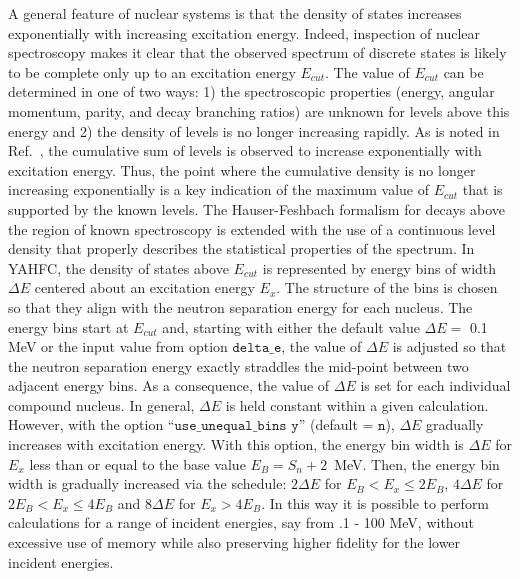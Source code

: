 \documentclass[
10pt,
showpacs,preprintnumbers,footinbib,
amsfonts,amsmath,amssymb,
aps,
prc,twocolumn,groupedaddress,superscriptaddress,
showkeys,
nofootinbib
]{revtex4-1}
\begin{document}
A general feature of nuclear systems is that the density of states increases exponentially with increasing excitation energy. Indeed, inspection of nuclear spectroscopy makes it clear that the observed spectrum of discrete states is likely to be complete only up to an excitation energy $E_{cut}$. The value of $E_{cut}$ can be determined in one of two ways: 1) the spectroscopic properties (energy, angular momentum, parity, and decay branching ratios) are unknown for levels above this energy and 2) the density of levels is no longer increasing rapidly. 
As is noted in Ref.~\cite{Gilbert:1965}, the cumulative sum of levels is observed to increase exponentially with excitation energy. Thus, the point where the cumulative density is no longer increasing exponentially is a key indication of the maximum value of $E_{cut}$ that is supported by the known levels.
The Hauser-Feshbach formalism for decays above the region of known spectroscopy is extended with the use of a continuous level density that properly describes the statistical properties of the spectrum. In YAHFC, the density of states above $E_{cut}$ is represented by energy bins of width 
$\Delta E$ centered about an excitation energy $E_x$. The structure of the bins is chosen so that they align with the neutron separation energy for each nucleus. The energy bins start at $E_{cut}$ and, starting with either the default value $\Delta E = $ 0.1 MeV or the input value from option 
${\texttt{delta\_e}}$, the value of $\Delta E$ is adjusted so that the neutron separation energy exactly straddles the mid-point between two adjacent energy bins. As a consequence, the value of $\Delta E$ is set for each individual compound nucleus. In general, $\Delta E$ is held constant within a given calculation. However, with the option 
``${\texttt{use\_unequal\_bins y}}$'' (default = ${\texttt{n}}$), $\Delta E$ gradually increases with excitation energy. With this option, the energy bin width is $\Delta E$ for $E_x$ less than or equal to the base value $E_B = S_n + 2$~MeV. Then, the energy bin width is gradually increased via the schedule: $2\Delta E$ for $E_B < E_x \le 2E_B$, $4\Delta E$ for $2E_B < E_x \le 4E_B$ and $8\Delta E$ for $E_x > 4E_B$. In this way it is possible to perform calculations for a range of incident energies, say from .1 - 100 MeV, without excessive use of memory while also preserving higher fidelity for the lower incident energies.
\end{document}
